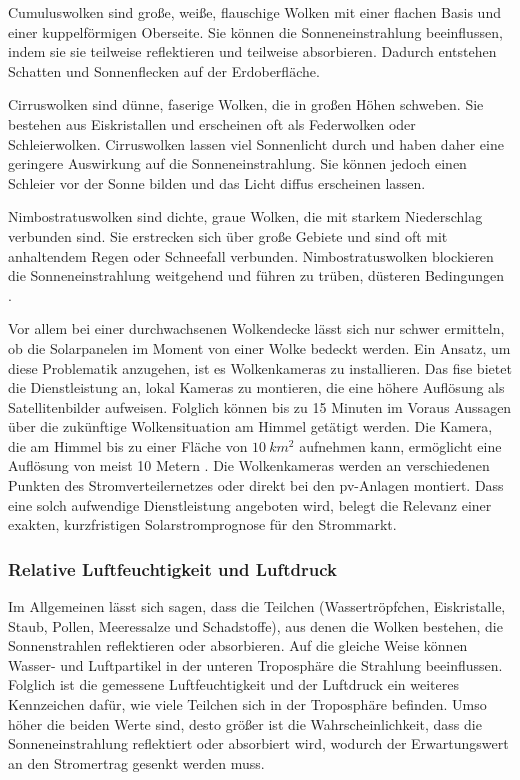 \documentclass[12pt, a4paper]{article}
\begin{document}
Cumuluswolken sind große, weiße, flauschige Wolken mit einer flachen Basis und einer kuppelförmigen Oberseite. Sie können die Sonneneinstrahlung beeinflussen, indem sie sie teilweise reflektieren und teilweise absorbieren. Dadurch entstehen Schatten und Sonnenflecken auf der Erdoberfläche.

Cirruswolken sind dünne, faserige Wolken, die in großen Höhen schweben. Sie bestehen aus Eiskristallen und erscheinen oft als Federwolken oder Schleierwolken. Cirruswolken lassen viel Sonnenlicht durch und haben daher eine geringere Auswirkung auf die Sonneneinstrahlung. Sie können jedoch einen Schleier vor der Sonne bilden und das Licht diffus erscheinen lassen.

Nimbostratuswolken sind dichte, graue Wolken, die mit starkem Niederschlag verbunden sind. Sie erstrecken sich über große Gebiete und sind oft mit anhaltendem Regen oder Schneefall verbunden. Nimbostratuswolken blockieren die Sonneneinstrahlung weitgehend und führen zu trüben, düsteren Bedingungen \cite{ws:bildungsserverhamburg}.

Vor allem bei einer durchwachsenen Wolkendecke lässt sich nur schwer ermitteln, ob die Solarpanelen im Moment von einer Wolke bedeckt werden. Ein Ansatz, um diese Problematik anzugehen, ist es Wolkenkameras zu installieren. Das \ac{fise} bietet die Dienstleistung an, lokal Kameras zu montieren, die eine höhere Auflösung als Satellitenbilder aufweisen. Folglich können bis zu 15 Minuten im Voraus Aussagen über die zukünftige Wolkensituation am Himmel getätigt werden. Die Kamera, die am Himmel bis zu einer Fläche von $10\ km^2$ aufnehmen kann, ermöglicht eine Auflösung von meist 10 Metern \cite{ws:fraunhofer}. Die Wolkenkameras werden an verschiedenen Punkten des Stromverteilernetzes oder direkt bei den \ac{pv}-Anlagen montiert. Dass eine solch aufwendige Dienstleistung angeboten wird, belegt die Relevanz  einer exakten, kurzfristigen Solarstromprognose für den Strommarkt.

\subsubsection{Relative Luftfeuchtigkeit und Luftdruck}

Im Allgemeinen lässt sich sagen, dass die Teilchen (Wassertröpfchen, Eiskristalle, Staub, Pollen, Meeressalze und Schadstoffe), aus denen die Wolken bestehen, die Sonnenstrahlen reflektieren oder absorbieren. Auf die gleiche Weise können Wasser- und Luftpartikel in der unteren Troposphäre die Strahlung beeinflussen. Folglich ist die gemessene Luftfeuchtigkeit und der Luftdruck ein weiteres Kennzeichen dafür, wie viele Teilchen sich in der Troposphäre befinden. Umso höher die beiden Werte sind, desto größer ist die Wahrscheinlichkeit, dass die Sonneneinstrahlung reflektiert oder absorbiert wird, wodurch der Erwartungswert an den Stromertrag gesenkt werden muss. 
\end{document}
